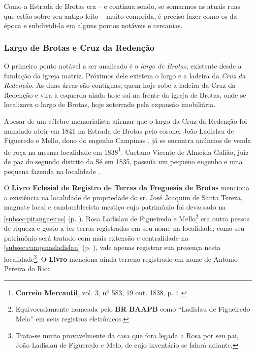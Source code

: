 Como a Estrada de Brotas era -- e continua sendo, se somarmos as atuais ruas que estão sobre seu antigo leito -- muito comprida, é preciso fazer como os da época e subdividi-la em alguns pontos notáveis e cercanias.

\subsubsection{Largo de Brotas e Cruz da Redenção}\label{subsubsec:brotasredencao}

O primeiro ponto notável a ser analisado é o \textit{largo de Brotas}, existente desde a fundação da igreja matriz. Próximos dele existem o largo e a ladeira da \textit{Cruz da Redenção}. As duas áreas são contíguas; quem hoje sobe a ladeira da Cruz da Redenção e vira à esquerda ainda hoje sai na frente da igreja de Brotas, onde se localizava o largo de Brotas, hoje soterrado pela expansão imobiliária.

Apesar de um célebre memorialista afirmar que o largo da Cruz da Redenção foi mandado abrir em 1841 na Estrada de Brotas pelo coronel João Ladislau de Figueredo e Mello, dono do engenho Campinas \cite[p.~88]{campos_brotas_1942}, já se encontra anúncios de venda de roça na mesma localidade em 1838\footnote{\textbf{Correio Mercantil}, vol. 3, nº 583, 19 out. 1838, p. 4.}. Caetano Vicente de Almeida Galião, juiz de paz do segundo distrito da Sé em 1835, possuía um pequeno engenho e uma pequena fazenda na localidade \cite[p.~239]{REIS2004males}.

O \textbf{Livro Eclesial de Registro de Terras da Freguesia de Brotas} menciona a existência na localidade de propriedade do sr. José Joaquim de Santa Tereza, magnate local e candomblecista mestiço cujo patrimônio foi devassado na \autoref{subsec:pitangueiras} (p. \pageref{subsec:pitangueiras}). Rosa Ladislau de Figueiredo e Mello\footnote{Equivocadamente nomeada pelo \textbf{BR BAAPB} como ``Ladislau de Figueiredo Melo'' em seus registros eletrônicos.} era outra pessoa de riqueza e gosto a ter terras registradas em seu nome na localidade; como seu patrimônio será tratado com mais extensão e centralidade na \autoref{subsec:campinasladislau} (p. \pageref{subsec:campinasladislau}), vale apenas registrar sua presença nesta localidade\footnote{Trata-se muito provavelmente da casa que fora legada a Rosa por seu pai, João Ladislau de Figueredo e Melo, de cujo inventário se falará adiante.}. O \textbf{Livro} menciona ainda terreno registrado em nome de Antonio Pereira do Rio:

